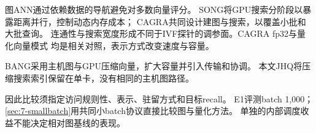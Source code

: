图ANN通过依赖数据的导航避免对多数向量评分。
SONG将GPU搜索分阶段以暴露距离并行，控制动态内存成本\cite{song}；
CAGRA共同设计建图与搜索，以覆盖小批和大批查询\cite{cagra}。
连通性与搜索宽度形成不同于IVF探针的调参面。CAGRA fp32与量化向量模式
均是相关对照，表示方式改变速度与容量。

BANG采用主机图与GPU压缩向量，扩大容量并引入传输和协调\cite{bang}。
本文JHQ将压缩搜索索引保留在单卡，没有相同的主机图路径。

因此比较须指定访问规则性、表示、驻留方式和目标recall。
E1评测batch 1,000；\cref{sec:7-smallbatch}用共同小batch协议直接比较图与量化方法。
单独的内部调度收益不能决定相对图基线的表现。
